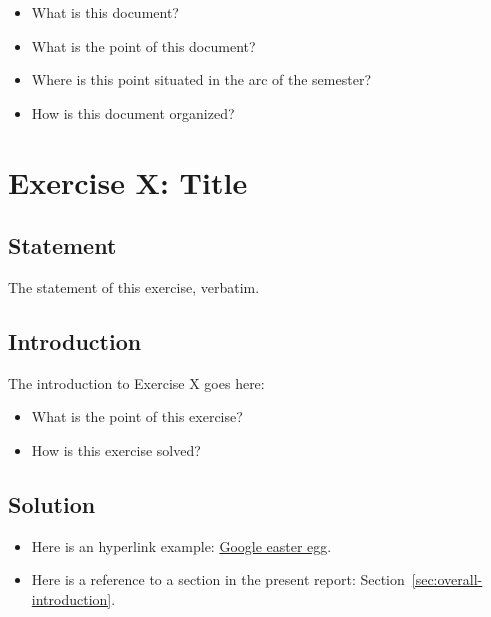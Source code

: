 \documentclass[12pt]{article}
\begin{document}
\begin{itemize}

\item
  What is this document?

\item
  What is the point of this document?

\item
  Where is this point situated in the arc of the semester?

\item
  How is this document organized?

\end{itemize}


\newpage

\section{Exercise X: Title}


\subsection{Statement}

The statement of this exercise, verbatim.


\subsection{Introduction}

The introduction to Exercise X goes here:

\begin{itemize}

\item
  What is the point of this exercise?

\item
  How is this exercise solved?

\end{itemize}


\subsection{Solution}

\begin{itemize}

\item
  Here is an hyperlink example:
  \href{https://www.google.com/search?q=recursion}{Google easter egg}.

\item
  Here is a reference to a section in the present report: Section~\ref{sec:overall-introduction}.

\end{itemize}
\end{document}
